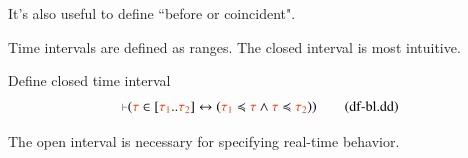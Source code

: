 \pn It's also useful to define ``before or coincident".  

\dfblbeforeeq

%
%
%

\pn Time intervals are defined as ranges.  The closed interval is most intuitive.

\begin{definition} {Define closed time interval}
\begin{align}
\mm{\vdash} ( \msc{\tau} \in [ \msc{\tau_1} .. \msc{\tau_2} ] \leftrightarrow (
    \msc{\tau_1} \preccurlyeq \msc{\tau} \wedge \msc{\tau} \preccurlyeq \msc{\tau_2} )
    )\label{eq:df-bl.dd}\tag{df-bl.dd}
\end{align}
\end{definition}

\pn The open interval is necessary for specifying real-time behavior.

